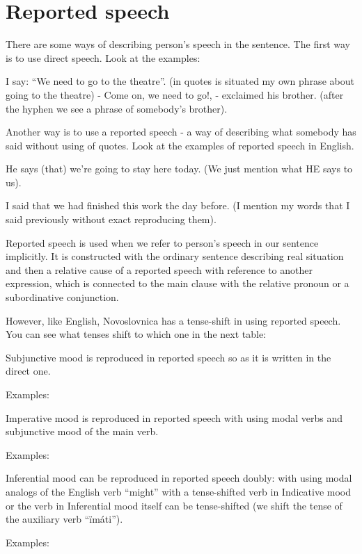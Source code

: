 \section{Reported speech}

There are some ways of describing person’s speech in the sentence. The first way is to use direct speech. Look at the examples:

I say: “We need to go to the theatre”. (in quotes is situated my own phrase about going to the theatre)
- Come on, we need to go!, - exclaimed his brother. (after the hyphen we see a phrase of somebody’s brother).

Another way is to use a reported speech - a way of describing what somebody has said without using of quotes. Look at the examples of reported speech in English.

He says (that) we’re going to stay here today. (We just mention what HE says to us).

I said that we had finished this work the day before. (I mention my words that I said previously without exact reproducing them).

Reported speech is used when we refer to person’s speech in our sentence implicitly. It is constructed with the ordinary sentence describing real situation and then a relative cause of a reported speech with reference to another expression, which is connected to the main clause with the relative pronoun or a subordinative conjunction.

However, like English, Novoslovnica has a tense-shift in using reported speech. You can see what tenses shift to which one in the next table:


Subjunctive mood is reproduced in reported speech so as it is written in the direct one. 

Examples:


Imperative mood is reproduced in reported speech with using modal verbs and subjunctive mood of the main verb.

Examples:

Inferential mood can be reproduced in reported speech doubly: with using modal analogs of the English verb “might” with a tense-shifted verb in Indicative mood or the verb in Inferential mood itself can be tense-shifted (we shift the tense of the auxiliary verb “ïmáti”).

Examples: 
